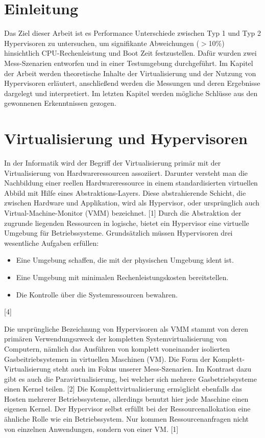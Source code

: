 \documentclass[conference]{IEEEtran}
\begin{document}
\IEEEpeerreviewmaketitle

\section{Einleitung}
\label{Einleitung}

Das Ziel dieser Arbeit ist es Performance Unterschiede zwischen Typ 1 und Typ 2 Hypervisoren zu untersuchen, um signifikante Abweichungen ($>$10\%) hinsichtlich CPU-Rechenleistung und Boot Zeit festzustellen. Dafür wurden zwei Mess-Szenarien entworfen und in einer Testumgebung durchgeführt. Im Kapitel der Arbeit werden theoretische Inhalte der Virtualisierung und der Nutzung von Hypervisoren erläutert, anschließend werden die Messungen und deren Ergebnisse dargelegt und interpretiert. Im letzten Kapitel werden mögliche Schlüsse aus den gewonnenen Erkenntnissen gezogen. 

\section{Virtualisierung und Hypervisoren}
\label{Virtualisierung und Hypervisoren}	
In der Informatik wird der Begriff der Virtualisierung primär mit der Virtualisierung von Hardwareressourcen assoziiert. Darunter versteht man die Nachbildung einer reellen Hardwareressource in einem standardisierten virtuellen Abbild mit Hilfe eines Abstraktions-Layers. Diese abstrahierende Schicht, die zwischen Hardware und Applikation, wird als Hypervisor, oder ursprünglich auch Virtual-Machine-Monitor (VMM) bezeichnet. [1] Durch die Abstraktion der zugrunde liegenden Ressourcen in logische, bietet ein Hypervisor eine virtuelle Umgebung für Betriebssysteme. Grundsätzlich müssen Hypervisoren drei wesentliche Aufgaben erfüllen: 
\begin{itemize}
	\item Eine Umgebung schaffen, die mit der physischen Umgebung ident ist. 
	\item Eine Umgebung mit minimalen Rechenleistungskosten bereitstellen. 
	\item Die Kontrolle über die Systemressourcen bewahren. 
\end{itemize}
[4]

Die ursprüngliche Bezeichnung von Hypervisoren als VMM stammt von deren primären Verwendungszweck der kompletten Systemvirtualisierung von Computern, nämlich das Ausführen von komplett voneinander isolierten Gasbeitriebsystemen in virtuellen Maschinen (VM). Die Form der Komplett-Virtualisierung steht auch im Fokus unserer Mess-Szenarien. Im Kontrast dazu gibt es auch die Paravirtualisierung, bei welcher sich mehrere Gasbetriebsysteme einen Kernel teilen. [2] Die Komplettvirtualisierung ermöglicht ebenfalls das Hosten mehrerer Betriebssysteme, allerdings benutzt hier jede Maschine einen eigenen Kernel. Der Hypervisor selbst erfüllt bei der Ressourcenallokation eine ähnliche Rolle wie ein Betriebssystem. Nur kommen Ressourcenanfragen nicht von einzelnen Anwendungen, sondern von einer VM. [1]
\end{document}
